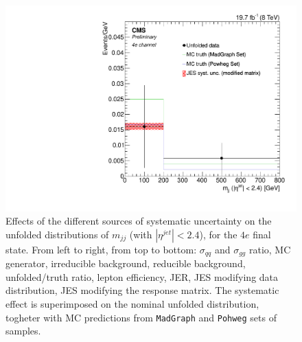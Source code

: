 \begin{figure}[hbtp]
\begin{center}
    \includegraphics[width=0.8\cmsFigWidth]{Figures/Unfolding/Systematics/ZZTo4e_CentralMjj_JES_ModMat_Mad_fr}
    \caption{Effects of the different sources of systematic uncertainty on the unfolded distributions of $m_{jj}$ (with $|\eta^{jet}|<2.4$), for the $4e$ final state. From left to right, from top to bottom: $\sigma_{qq}$ and $\sigma_{gg}$ ratio, MC generator, irreducible background, reducible background, unfolded/truth ratio, lepton efficiency, JER, JES modifying data distribution, JES modifying the response matrix. The systematic effect is superimposed on the nominal unfolded distribution, togheter with MC predictions from \texttt{MadGraph} and \texttt{Pohweg} sets of samples.}
    \label{fig:CentralMjj_syst_4e}
  \end{center}
\end{figure}

